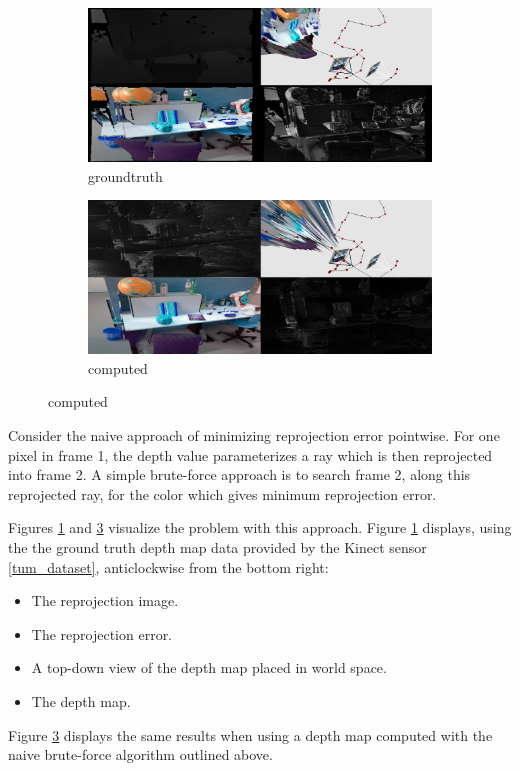 \documentclass[conference]{IEEEtran}
\begin{document}
\begin{figure}[htbp]
\begin{subfigure}[b]{0.5\textwidth}
\centerline{\includegraphics[width=\textwidth]{figures/noisevis_groundtruth.png}}
\caption{groundtruth}
\label{noisevis_groundtruth}
\end{subfigure}
\begin{subfigure}[b]{0.5\textwidth}
\centerline{\includegraphics[width=\textwidth]{figures/noisevis_computed.png}}
\caption{computed}
\label{noisevis_computed}
\end{subfigure}
\end{figure}

Consider the naive approach of minimizing reprojection error pointwise. For one pixel in frame 1, the depth value parameterizes a ray which
is then reprojected into frame 2. A simple brute-force approach is to search frame 2, along this reprojected ray, for the color which gives minimum
reprojection error.

Figures \ref{noisevis_groundtruth} and \ref{noisevis_computed} visualize the problem with this approach.
Figure \ref{noisevis_groundtruth} displays, using the the ground truth depth map data provided by the Kinect sensor \ref{tum_dataset}, anticlockwise
from the bottom right:
\begin{itemize}
    \item The reprojection image.
    \item The reprojection error.
    \item A top-down view of the depth map placed in world space.
    \item The depth map.
\end{itemize}
Figure \ref{noisevis_computed} displays the same results when using a depth map computed with the naive brute-force algorithm outlined above.
\end{document}
